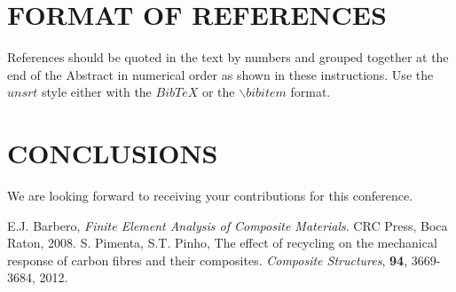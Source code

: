 \documentclass[12pt,a4paper]{article}
\begin{document}
\section{FORMAT OF REFERENCES}
References should be quoted in the text by numbers \cite{Barbero,Pimenta} and grouped together at the end of the Abstract in numerical order as shown in these instructions. Use the $unsrt$ style either with the $BibTeX$ or the $\backslash$$bibitem$ format.

\section{CONCLUSIONS}

We are looking forward to receiving your contributions for this conference.


\begin{thebibliography}{10}

 E.J. Barbero, \textit{Finite Element Analysis of Composite Materials}. CRC Press, Boca Raton, 2008.
 S. Pimenta, S.T. Pinho, The effect of recycling on the mechanical response of carbon fibres and their composites. \textit{Composite Structures}, \textbf{94}, 3669-3684, 2012.

\end{thebibliography}
\end{document}
